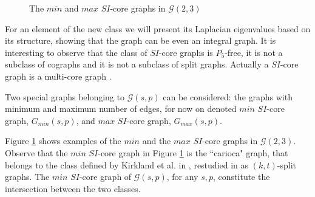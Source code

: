 \documentclass[preprint,12pt]{elsarticle}
\begin{document}
\begin{figure}[h]
\begin{center}
\caption{The $min$ and $max$ $SI$-core graphs in $\mathcal{G}(2,3)$}
\label{fig:minmaxplain}
\end{center}
\end{figure}

For an element of the new class we will present its Laplacian eigenvalues based on its structure, showing that the graph can be even an integral graph.
It is interesting to observe that the class of  $SI$-core graphs is $P_5$-free, 
it  is not a subclass of cographs and it is not a subclass of  split graphs.
Actually a $SI$-core graph is a multi-core graph \cite{MP24}.

Two special graphs belonging to $\mathcal{G}(s,p)$ can be considered:
the graphs with minimum and  maximum number of edges, for now on denoted $min$ $SI$-core graph, $G_{min}(s,p)$,
 and $max$ $SI$-core graph, $G_{max}(s,p)$.

Figure \ref{fig:minmaxplain} shows examples of the $min$  and the $max$ $SI$-core graphs in $\mathcal{G}(2,3)$.
Observe that the $min$ $SI$-core graph in Figure \ref{fig:minmaxplain} is the ``carioca" graph,
that belongs to the class defined by Kirkland et al. in \cite{KFDA10}, restudied in \cite{AJM24} as
$(k,t)$-split graphs. 
The $min$ $SI$-core graph of $\mathcal{G}(s,p)$, for any $s,p$, 
constitute the intersection between the two classes.
\end{document}
